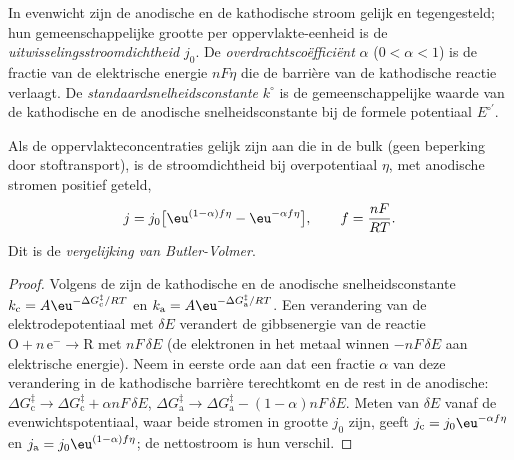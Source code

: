 \begin{definition}\label{def:b3:electrode-kinetics:exchange}
In evenwicht zijn de anodische en de kathodische stroom gelijk en
tegengesteld; hun gemeenschappelijke grootte per oppervlakte-eenheid is de
\emph{uitwisselingsstroomdichtheid}
$j_0$. De \emph{overdrachtscoëfficiënt}
 $\alpha$ ($0 < \alpha < 1$) is de fractie van de
elektrische energie $nF\eta$ die de barrière van de kathodische reactie
verlaagt. De
\emph{standaardsnelheidsconstante}
$k^\circ$ is de gemeenschappelijke waarde van de kathodische en de
anodische snelheidsconstante bij de formele potentiaal $E^{\circ\prime}$.
\end{definition}

\begin{theorem}\label{thm:b3:electrode-kinetics:butler-volmer}
Als de oppervlakteconcentraties gelijk zijn aan die in de bulk (geen
beperking door stoftransport), is de stroomdichtheid bij overpotentiaal
$\eta$, met anodische stromen positief geteld,
\[
  j = j_0\bigl[\eu^{(1 - \alpha)f\eta} - \eu^{-\alpha f\eta}\bigr], \qquad f = \frac{nF}{RT}.
\]
Dit is de \emph{vergelijking van Butler-Volmer}.
\end{theorem}

\begin{proof}
Volgens de  zijn de kathodische en de anodische
snelheidsconstante
$k_{\mathrm c} = A\eu^{-\Delta G_{\mathrm c}^{\ddagger}/RT}$ en $k_{\mathrm a} = A\eu^{-\Delta G_{\mathrm a}^{\ddagger}/RT}$. Een verandering van de elektrodepotentiaal met $\delta E$
verandert de gibbsenergie van de reactie $\mathrm{O} + n\,\mathrm{e}^- \to \mathrm{R}$ met $nF\,\delta E$ (de elektronen
in het metaal winnen $-nF\,\delta E$ aan elektrische energie). Neem in
eerste orde aan dat een fractie $\alpha$ van deze verandering in de
kathodische barrière terechtkomt en de rest in de anodische: $\Delta G_{\mathrm c}^{\ddagger} \to \Delta G_{\mathrm c}^{\ddagger} + \alpha nF\,\delta E$, $\Delta G_{\mathrm a}^{\ddagger} \to \Delta G_{\mathrm a}^{\ddagger} - (1 - \alpha)nF\,\delta E$. Meten van $\delta E$
vanaf de evenwichtspotentiaal, waar beide stromen in grootte $j_0$ zijn,
geeft $j_{\mathrm c} = j_0\eu^{-\alpha f\eta}$ en $j_{\mathrm a} = j_0\eu^{(1 - \alpha)f\eta}$; de nettostroom is hun
verschil.
\end{proof}

